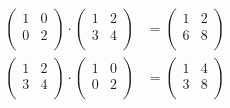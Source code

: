 \documentclass{article}
\begin{document}
\begin{align*}
  \begin{pmatrix}
    1 & 0 \\
    0 & 2 \\
  \end{pmatrix}
  \cdot
  \begin{pmatrix}
    1 & 2 \\
    3 & 4 \\
  \end{pmatrix}
  &=
  \begin{pmatrix}
    1 & 2 \\
    6 & 8 \\
  \end{pmatrix} \\
  \begin{pmatrix}
    1 & 2 \\
    3 & 4 \\
  \end{pmatrix}
  \cdot
  \begin{pmatrix}
    1 & 0 \\
    0 & 2 \\
  \end{pmatrix}
  &=
  \begin{pmatrix}
    1 & 4 \\
    3 & 8 \\
  \end{pmatrix}
\end{align*}
\end{document}
